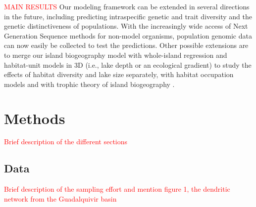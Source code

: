 \documentclass[12pt]{article}
\newcommand{\carlos}[1]{\textcolor{Red}{#1}}
\begin{document}
\carlos{MAIN RESULTS}
Our modeling framework can be extended in several directions in the
future, including predicting intraspecific genetic and trait diversity
and the genetic distinctiveness of populations. With the increasingly
wide access of Next Generation Sequence methods for non-model
organisms, population genomic data can now easily be collected to test
the predictions. Other possible extensions are to merge our island
biogeography model with whole-island regression and habitat-unit
models in 3D (i.e., lake depth or an ecological gradient) to study the
effects of habitat diversity and lake size separately, with habitat
occupation models \citep{guisan_sesam_2011} and with trophic theory of
island biogeography \citep{Gravel_trophic_2011}.

\section{Methods}

\carlos{Brief description of the different sections}

\subsection{Data}

\carlos{Brief description of the sampling effort and mention figure 1, the dendritic network from the Guadalquivir basin}




\end{document}
